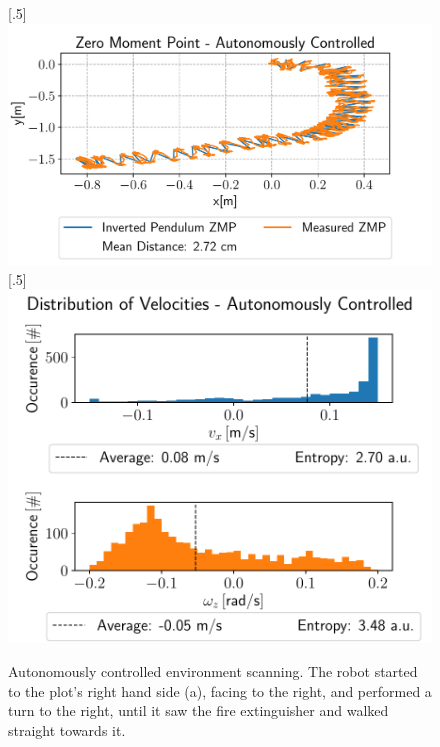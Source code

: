 \begin{figure}[h!] 
	[.5\linewidth]{\includegraphics[scale=.45]{chapters/04_experiments/02_autonomous_walking/out_of_sight_walk_01_zmp.pdf}}
	[.5\linewidth]{\includegraphics[scale=.45]{chapters/04_experiments/02_autonomous_walking/out_of_sight_walk_01_entropy.pdf}}
	\caption{Autonomously controlled environment scanning. The robot started to the plot's right hand side (a), facing to the right, and performed a turn to the right, until it saw the fire extinguisher and walked straight towards it.}
	\label{fig::424_aw_basic_sight}
\end{figure} 
